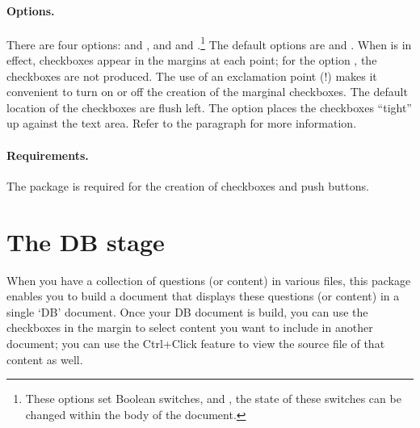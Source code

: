 \documentclass{article}
\def\FmtMP#1{\marginpar{\small\itshape\raggedleft#1}}
\let\uif\textsf
\begin{document}
\paragraph*{Options.} There are four options:  and \FmtMP{\opt{dbmode}\\\relax\opt{!dbmode}},
and  and
\FmtMP{\opt{tight}\\\relax\opt{!tight}}.\footnote{These options
set Boolean switches,  and , the state of
these switches can be changed within the body of the document.} The default
options are  and . When  is in effect,
checkboxes appear in the margins at each  point; for the option
, the checkboxes are not produced. The use of an exclamation
point (!) makes it convenient to turn on or off the creation of the marginal
checkboxes. The default location of the checkboxes are flush left. The
 option places the checkboxes ``tight'' up against the text area.
Refer to the \textbf{} paragraph for more information.

\paragraph*{Requirements.} The  package is required for the creation of
checkboxes and push buttons.

\section{The DB stage}

When you have a collection of questions (or content) in various files, this
package enables you to build a document that displays these questions (or
content) in a single `DB' document. Once your DB document is build, you can
use the checkboxes in the margin to select content you want to include in
another document; you can use the \uif{Ctrl+Click} feature to view the source
file of that content as well.
\end{document}
